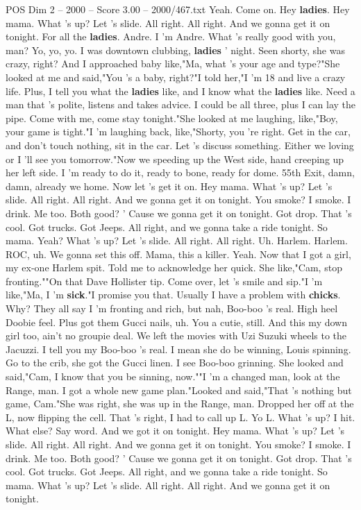 \begin{textsample}{POS Dim 2 – 2000 – Score 3.00 – 2000/467.txt}  \label{ex:f2_pos_004}
Yeah.
Come on.
Hey \textbf{ladies}.
Hey mama.
What 's up?
Let 's slide.
All right.
All right.
And we gonna get it on tonight.
For all the \textbf{ladies}.
Andre.
I 'm Andre.
What 's really good with you, man?
Yo, yo, yo.
I was downtown clubbing, \textbf{ladies} ' night.
Seen shorty, she was crazy, right?
And I approached baby like,"Ma, what 's your age and type?"She looked at me and said,"You 's a baby, right?"I told her,"I 'm 18 and live a crazy life.
Plus, I tell you what the \textbf{ladies} like, and I know what the \textbf{ladies} like.
Need a man that 's polite, listens and takes advice.
I could be all three, plus I can lay the pipe.
Come with me, come stay tonight."She looked at me laughing, like,"Boy, your game is tight."I 'm laughing back, like,"Shorty, you 're right.
Get in the car, and don't touch nothing, sit in the car.
Let 's discuss something.
Either we loving or I 'll see you tomorrow."Now we speeding up the West side, hand creeping up her left side.
I 'm ready to do it, ready to bone, ready for dome. 55th Exit, damn, damn, already we home.
Now let 's get it on.
Hey mama.
What 's up?
Let 's slide.
All right.
All right.
And we gonna get it on tonight.
You smoke?
I smoke.
I drink.
Me too.
Both good? ' Cause we gonna get it on tonight.
Got drop.
That 's cool.
Got trucks.
Got Jeeps.
All right, and we gonna take a ride tonight.
So mama.
Yeah?
What 's up?
Let 's slide.
All right.
All right.
Uh.
Harlem.
Harlem.
ROC, uh.
We gonna set this off.
Mama, this a killer.
Yeah.
Now that I got a girl, my ex-one Harlem spit.
Told me to acknowledge her quick.
She like,"Cam, stop fronting.""On that Dave Hollister tip.
Come over, let 's smile and sip."I 'm like,"Ma, I 'm \textbf{sick}."I promise you that.
Usually I have a problem with \textbf{chicks}.
Why?
They all say I 'm fronting and rich, but nah, Boo-boo 's real.
High heel Doobie feel.
Plus got them Gucci nails, uh.
You a cutie, still.
And this my down girl too, ain't no groupie deal.
We left the movies with Uzi Suzuki wheels to the Jacuzzi.
I tell you my Boo-boo 's real.
I mean she do be winning, Louis spinning.
Go to the crib, she got the Gucci linen.
I see Boo-boo grinning.
She looked and said,"Cam, I know that you be sinning, now.""I 'm a changed man, look at the Range, man.
I got a whole new game plan."Looked and said,"That 's nothing but game, Cam."She was right, she was up in the Range, man.
Dropped her off at the L, now flipping the cell.
That 's right, I had to call up L.
Yo L.
What 's up?
I hit.
What else?
Say word.
And we got it on tonight.
Hey mama.
What 's up?
Let 's slide.
All right.
All right.
And we gonna get it on tonight.
You smoke?
I smoke.
I drink.
Me too.
Both good? ' Cause we gonna get it on tonight.
Got drop.
That 's cool.
Got trucks.
Got Jeeps.
All right, and we gonna take a ride tonight.
So mama.
What 's up?
Let 's slide.
All right.
All right.
And we gonna get it on tonight.

\end{textsample}

